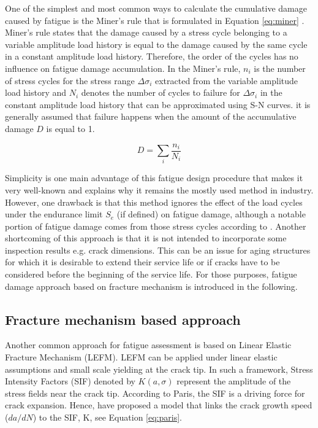One of the simplest and most common ways to calculate the cumulative damage caused by fatigue is the Miner's rule that is formulated in Equation \ref{eq:miner} \citep{miner1945}.
Miner's rule states that the damage caused by a stress cycle belonging to a variable amplitude load history is equal to the damage caused 
by the same cycle in a constant amplitude load history. Therefore, the order of the cycles has no influence on fatigue damage accumulation. In the Miner's rule, $n_i$ is the number 
of stress cycles for the stress range $\Delta \sigma_i$ extracted from the variable amplitude load history and
$N_i$ denotes the number of cycles to failure for  $\Delta \sigma_i$ in the constant amplitude load history that can be approximated using S-N curves. it is generally assumed that failure 
happens when the amount of the accumulative damage $D$ is equal to 1. 

\begin{equation}
 D = \sum_i \frac{n_i}{N_i}
 \label{eq:miner}
\end{equation}

Simplicity is one main advantage of this fatigue design procedure that makes it very well-known and explains why it remains the mostly used method in industry. 
However, one drawback is that this method ignores the effect of the load cycles under the endurance limit $S_e$ (if defined) on fatigue damage, 
although a notable portion of fatigue damage comes from those stress cycles according to \citet{MARQUIS2011208, lukic1999}. Another shortcoming of this approach is that it is not intended 
to incorporate some inspection results e.g. crack dimensions. This can be an issue for aging structures for which it is desirable to extend their service life or if cracks have to be considered 
before the beginning of the service life. For those purposes, fatigue damage approach based on fracture mechanism is introduced in the following. 

\subsection{Fracture mechanism based approach}

\noindent
Another common approach for fatigue assessment is based on Linear Elastic Fracture Mechanism (LEFM). LEFM can be applied under linear elastic assumptions and small scale yielding at the crack tip. 
In such a framework, Stress Intensity Factors (SIF) denoted by $K(a, \sigma)$ represent the amplitude of the stress fields near the crack tip. According to Paris, the SIF is a driving force for 
crack expansion. Hence, \citet{paris1963} have proposed a model that links the crack growth speed ($da/dN$) to the SIF, K, see Equation \ref{eq:paris}. 

